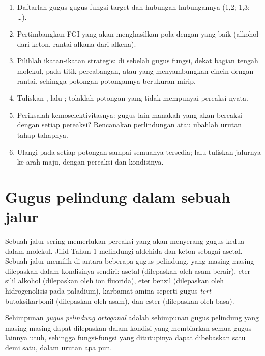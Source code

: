 \begin{method}\label{met:b2:retrosynthesis:retrosynthesis}
\begin{enumerate}
  \item Daftarlah gugus-gugus fungsi target dan hubungan-hubungannya (1,2; 1,3; \dots).
  \item Pertimbangkan FGI yang akan menghasilkan pola dengan  yang
        baik (alkohol dari keton, rantai alkana dari alkena).
  \item Pilihlah ikatan-ikatan strategis: di sebelah gugus fungsi, dekat
        bagian tengah molekul, pada titik percabangan, atau yang
        menyambungkan cincin dengan rantai, sehingga potongan-potongannya
        berukuran mirip.
  \item Tuliskan , lalu ; tolaklah
        potongan yang tidak mempunyai pereaksi nyata.
  \item Periksalah kemoselektivitasnya: gugus lain manakah yang akan
        bereaksi dengan setiap pereaksi? Rencanakan perlindungan atau ubahlah
        urutan tahap-tahapnya.
  \item Ulangi pada setiap potongan sampai semuanya tersedia; lalu tuliskan
        jalurnya ke arah maju, dengan pereaksi dan kondisinya.
\end{enumerate}
\end{method}

\section{Gugus pelindung dalam sebuah jalur}

Sebuah jalur sering memerlukan pereaksi yang akan menyerang gugus kedua
dalam molekul. Jilid Tahun 1 melindungi aldehida dan keton sebagai asetal.
Sebuah jalur memilih di antara beberapa gugus pelindung, yang masing-masing
dilepaskan dalam kondisinya sendiri: asetal (dilepaskan oleh asam berair),
eter silil alkohol (dilepaskan oleh ion fluorida), eter benzil (dilepaskan
oleh hidrogenolisis pada paladium), karbamat amina seperti gugus
\textit{tert}-butoksikarbonil (dilepaskan oleh asam), dan ester (dilepaskan
oleh basa).

\begin{definition}\label{def:b2:retrosynthesis:orthogonal}
Sehimpunan \emph{gugus pelindung ortogonal}
adalah sehimpunan gugus pelindung yang masing-masing dapat dilepaskan dalam
kondisi yang membiarkan semua gugus lainnya utuh, sehingga fungsi-fungsi
yang ditutupinya dapat dibebaskan satu demi satu, dalam urutan apa pun.
\end{definition}

